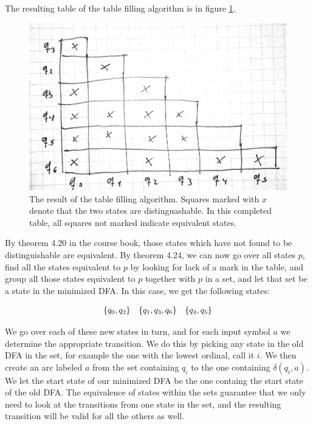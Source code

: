 \documentclass{article}
\begin{document}
\newpage
\section{}

The resulting table of the table filling algorithm is in figure \ref{fig:table-filling}.

\begin{figure}[htpb]
    \centering
    \includegraphics[width=0.8\linewidth]{table-filling}
    \caption{The result of the table filling algorithm. Squares marked with $x$ denote that the two states are distinguashable. In this completed table, all squares not marked indicate equivalent states.}
    \label{fig:table-filling}
\end{figure}

By theorem 4.20 in the course book, those states which have not found to be distinguishable are equivalent. By theorem 4.24, we can now go over all states $p$, find all the states equivalent to $p$ by looking for lack of a mark in the table, and group all those states equivalent to $p$ together with $p$ in a set, and let that set be a state in the minimized DFA. In this case, we get the following states:

\begin{align*}
    \begin{array}{c c c}
        \set{q_0,q_2} & \set{q_1,q_3,q_6} &\set{q_4,q_5}
    \end{array}
\end{align*}

We go over each of these new states in turn, and for each input symbol $a$ we determine the appropriate transition. We do this by picking any state in the old DFA in the set, for example the one with the lowest ordinal, call it $i$. We then create an arc labeled $a$ from the set containing $q_i$ to the one containing $\delta(q_i,a)$. We let the start state of our minimized DFA be the one containg the start state of the old DFA. The equivalence of states within the sets guarantee that we only need to look at the transitions from one state in the set, and the resulting transition will be valid for all the others as well.
\end{document}
